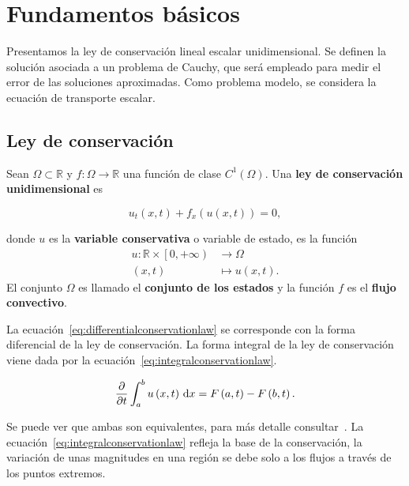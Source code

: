 \chapter{Fundamentos básicos}\label{ch:fundaments}

Presentamos la ley de conservación lineal escalar unidimensional.
Se definen la solución asociada a un problema de Cauchy, que será
empleado para medir el error de las soluciones aproximadas.
Como problema modelo, se considera la ecuación de transporte escalar.

\section{Ley de conservación}

\begin{definition}
  Sean
  \begin{math}
    \Omega\subset
    \mathbb{R}
  \end{math}
  y
  \begin{math}
    f\colon\Omega\to
    \mathbb{R}
  \end{math}
  una función de clase
  \begin{math}
    C^{1}
    \left(\Omega\right)
  \end{math}.
  Una \textbf{ley de conservación unidimensional} es

  \begin{equation}\label{eq:differentialconservationlaw}
    u_{t}
    \left(x,t\right)+
    f_{x}
    \left(
    u\left(x,t\right)
    \right)=
    0,
  \end{equation}

  donde $u$ es la \textbf{variable conservativa} o variable de
  estado, es la función
  \begin{align*}
    u\colon\mathbb{R}\times
    \left[0,+\infty\right) &
    \longrightarrow
    \Omega                   \\
    \left(x,t\right)       &
    \longmapsto
    u\left(x,t\right).
  \end{align*}
  El conjunto $\Omega$ es llamado el \textbf{conjunto de los estados}
  y la función $f$ es el \textbf{flujo convectivo}.
\end{definition}

\begin{remark}
  La ecuación~\eqref{eq:differentialconservationlaw} se corresponde
  con la forma diferencial de la ley de conservación.
  La forma integral de la ley de conservación viene dada por la
  ecuación~\eqref{eq:integralconservationlaw}.

  \begin{equation}\label{eq:integralconservationlaw}
    \diffp{}{t}
    \int_{a}^{b}
    u\left(x,t\right)\dl x=
    F\left(a,t\right)-
    F\left(b,t\right).
  \end{equation}

  Se puede ver que ambas son equivalentes, para más detalle
  consultar~\cite{Leveque2002}.
  La ecuación~\eqref{eq:integralconservationlaw} refleja la base de
  la conservación, la variación de unas magnitudes en una región se
  debe solo a los flujos a través de los puntos extremos.
\end{remark}

